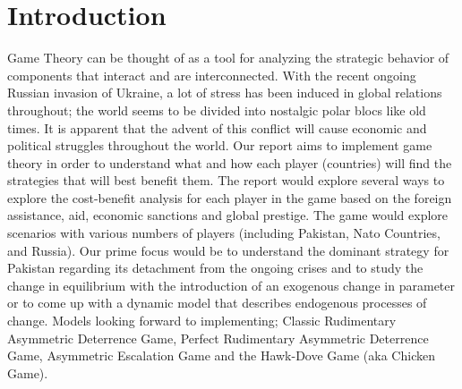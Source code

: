 \documentclass[runningheads]{llncs}
\begin{document}
\section{Introduction}
Game Theory can be thought of as a tool for analyzing the strategic behavior of components that interact and are interconnected. With the recent ongoing Russian invasion of Ukraine, a lot of stress has been induced in global relations throughout; the world seems to be divided into nostalgic polar blocs like old times. It is apparent that the advent of this conflict will cause economic and political struggles throughout the world. Our report aims to implement game theory in order to  understand what and how each player (countries) will find the strategies that will best benefit them. The report would explore several ways to explore the cost-benefit analysis for each player in the game based on the foreign assistance, aid, economic sanctions and global prestige. The game would explore scenarios  with various numbers of players (including Pakistan, Nato Countries, and Russia). Our prime  focus would be to understand the dominant strategy for Pakistan regarding its detachment from the ongoing crises and to study the change in equilibrium with the introduction of an exogenous  change in parameter or to come up with a dynamic model that describes endogenous processes of change. Models looking forward to implementing; Classic Rudimentary Asymmetric Deterrence Game, Perfect Rudimentary Asymmetric Deterrence Game, Asymmetric Escalation Game and the Hawk-Dove Game (aka Chicken Game).
\end{document}
